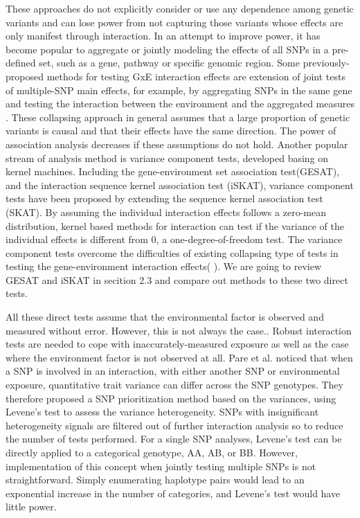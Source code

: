 \documentclass{article}
\begin{document}
	  These approaches do not explicitly consider or use any  dependence among genetic variants and can lose power from not capturing those variants whose effects are only manifest through interaction.	In an attempt to improve power, it has become popular to aggregate or jointly modeling the effects of all SNPs in a pre-defined set,  such as a gene, pathway or specific genomic region. Some previously-proposed methods for testing GxE interaction effects are extension of  joint tests of multiple-SNP main effects, for example, by aggregating SNPs in the same gene and testing the interaction between the environment and the aggregated measures \cite{jiao2013sberia, wang2015powerful, basu2011comparison}.  These collapsing approach in general assumes that a large proportion of genetic variants is causal and that their effects have the same direction. The power of association analysis decreases if these assumptions do not hold. Another popular stream of analysis method is variance component tests, developed basing on kernel machines. Including the gene-environment set association test(GESAT)\cite{lin2013test}, and the interaction sequence kernel association test (iSKAT)\cite{lin2016test}, variance component tests have been proposed by extending the sequence kernel association test (SKAT)\cite{wu2011rare}. By assuming the individual interaction effects follows a zero-mean distribution, kernel based methods for interaction can test if the variance of the individual effects is different from 0, a one-degree-of-freedom test. The variance component tests overcome the difficulties of existing collapsing type of tests in testing the gene-environment interaction effects(\cite{lin2016test} ). We are going to review GESAT and iSKAT in secition 2.3 and compare out methods to these two direct tests. 


	All these direct tests assume that the environmental factor is observed and measured without error. However, this is not always the case.. Robust interaction tests are needed to cope with inaccurately-measured exposure as well as the case where the environment factor is not observed at all. Pare et al. \cite{pare2010use} noticed that when a  SNP is involved in an interaction, with either another SNP or environmental exposure, quantitative trait variance can differ across the SNP genotypes. They therefore proposed a SNP prioritization method based on the variances, using Levene's test to assess the variance heterogeneity. SNPs with insignificant heterogeneity signals are filtered out of further interaction analysis so to reduce the number of tests performed. For a single SNP analyses, Levene's test can be directly applied to a categorical genotype, AA, AB, or BB. However, implementation of this concept when jointly testing multiple SNPs is not straightforward. Simply enumerating haplotype pairs would lead to an exponential increase in the number of categories, and Levene's test would have little power. 
	
\end{document}
